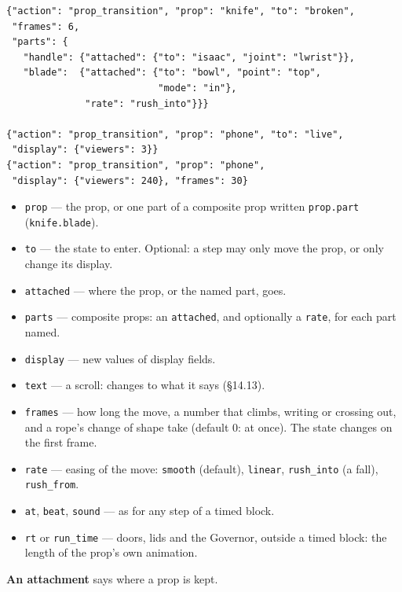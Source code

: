 \documentclass[
  12pt,
  letterpaper,
]{book}
\providecommand{\tightlist}{%
  \setlength{\itemsep}{0pt}\setlength{\parskip}{0pt}}
\begin{document}
\begin{verbatim}
{"action": "prop_transition", "prop": "knife", "to": "broken",
 "frames": 6,
 "parts": {
   "handle": {"attached": {"to": "isaac", "joint": "lwrist"}},
   "blade":  {"attached": {"to": "bowl", "point": "top",
                           "mode": "in"},
              "rate": "rush_into"}}}

{"action": "prop_transition", "prop": "phone", "to": "live",
 "display": {"viewers": 3}}
{"action": "prop_transition", "prop": "phone",
 "display": {"viewers": 240}, "frames": 30}
\end{verbatim}

\begin{itemize}
\tightlist
\item
  \texttt{prop} --- the prop, or one part of a composite prop written
  \texttt{prop.part} (\texttt{knife.blade}).
\item
  \texttt{to} --- the state to enter. Optional: a step may only move
  the prop, or only change its display.
\item
  \texttt{attached} --- where the prop, or the named part, goes.
\item
  \texttt{parts} --- composite props: an \texttt{attached}, and
  optionally a \texttt{rate}, for each part named.
\item
  \texttt{display} --- new values of display fields.
\item
  \texttt{text} --- a scroll: changes to what it says (\S14.13).
\item
  \texttt{frames} --- how long the move, a number that climbs,
  writing or crossing out, and a rope's change of shape take (default
  0: at once). The state changes on the first frame.
\item
  \texttt{rate} --- easing of the move: \texttt{smooth} (default),
  \texttt{linear}, \texttt{rush\_into} (a fall), \texttt{rush\_from}.
\item
  \texttt{at}, \texttt{beat}, \texttt{sound} --- as for any step of a
  timed block.
\item
  \texttt{rt} or \texttt{run\_time} --- doors, lids and the Governor,
  outside a timed block: the length of the prop's own animation.
\end{itemize}

\textbf{An attachment} says where a prop is kept.
\end{document}

